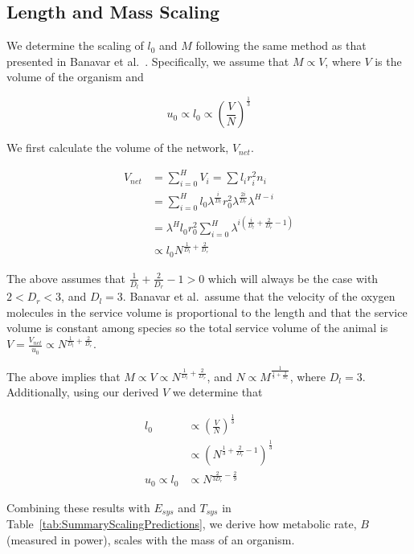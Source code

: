 \documentclass[12pt]{article}
\begin{document}
\subsection{Length and Mass Scaling}
\label{subsec:appendixLengthMass}

We determine the scaling of $l_0$ and $M$ following the same method as that
presented in Banavar et al.~\cite{banavar10}. Specifically, we assume that $M
\propto V$, where $V$ is the volume of the organism and

\begin{equation}
u_0 \propto l_0 \propto \left (\frac{V}{N} \right) ^{\frac{1}{3}}
\end{equation}

We first calculate the volume of the network, $V_{net}$.

\begin{align*}
V_{net} &= \sum_{i=0}^H V_i = \sum l_i r_i^2 n_i \\
  &= \sum_{i=0}^H l_0 \lambda^{\frac{i}{D_l}} r_0^2 \lambda^{\frac{2i}{D_r}}
  \lambda^{H-i} \\
  &= \lambda^H l_0 r_0^2 \sum_{i=0}^H \lambda^{i \left(\frac{i}{D_l} +
  \frac{2}{D_r} - 1 \right) } \\
  &\propto l_0 N^{\frac{1}{D_l} + \frac{2}{D_r}} 
\end{align*}

\noindent The above assumes that $\frac{1}{D_l} + \frac{2}{D_r} -1 > 0$ which
will always be the case with $2 < D_r < 3$, and $D_l=3$. Banavar et al.\ assume
that the velocity of the oxygen molecules in the service volume is proportional
to the length and that the service volume is constant among species so the
total service volume of the animal is $V = \frac{V_{net}}{u_0} \propto
N^{\frac{1}{D_l} + \frac{2}{D_r}}$.

The above implies that $M\propto V \propto N^{\frac{1}{D_l} +
\frac{2}{D_r}}$,
and $N \propto M^{\frac{1}{\frac{1}{3} + \frac{2}{D_r}}}$, where $D_l=3$.
Additionally, using our derived $V$ we determine that

\begin{align*}
l_0 & \propto \left( \frac{V}{N} \right)^{\frac{1}{3}} \\
    & \propto \left( N^{\frac{1}{3} + \frac{2}{D_r} - 1} \right)^{\frac{1}{3}} \\
u_0 \propto l_0 & \propto N^{\frac{2}{3D_r} - \frac{2}{9}}
\end{align*}

Combining these results with $E_{sys}$ and $T_{sys}$ in
Table~\ref{tab:SummaryScalingPredictions}, we derive how metabolic rate, $B$
(measured in power), scales with the mass of an organism.
\end{document}
